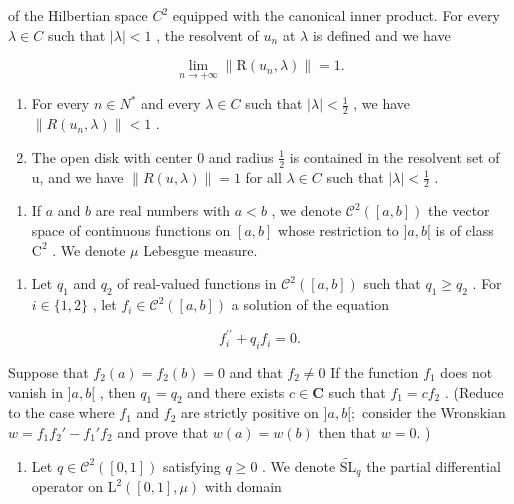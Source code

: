 of the Hilbertian space \(C^{2}\) equipped with the canonical inner product. For every \(\lambda \in C\) such that \(|\lambda| < 1\) , the resolvent of \(u_{n}\) at \(\lambda\) is defined and we have

\[
\lim _ {n \to + \infty} \| \mathrm{R} (u _ {n}, \lambda) \| = 1.
\]

\begin{enumerate}
\def\labelenumi{\alph{enumi})}
\setcounter{enumi}{3}
\tightlist
\item
  For every \(n \in N^{*}\) and every \(\lambda \in C\) such that \(|\lambda| < \frac{1}{2}\) , we have \(\|R(u_{n}, \lambda)\| < 1\) .
\item
  The open disk with center 0 and radius \(\frac{1}{2}\) is contained in the resolvent set of u, and we have \(\|R(u,\lambda)\|=1\) for all \(\lambda\in C\) such that \(|\lambda|<\frac{1}{2}\) .
\end{enumerate}

\begin{enumerate}
\def\labelenumi{\arabic{enumi})}
\setcounter{enumi}{19}
\tightlist
\item
  If \(a\) and \(b\) are real numbers with \(a < b\) , we denote \(\mathcal{C}^2([a,b])\) the vector space of continuous functions on \([a,b]\) whose restriction to \(]a,b[\) is of class \(\mathrm{C}^2\) . We denote \(\mu\) Lebesgue measure.
\end{enumerate}

\begin{enumerate}
\def\labelenumi{\alph{enumi})}
\tightlist
\item
  Let \(q_{1}\) and \(q_{2}\) of real-valued functions in \(\mathcal{C}^{2}([a,b])\) such that \(q_{1} \geqslant q_{2}\) . For \(i \in \{1,2\}\) , let \(f_{i} \in \mathcal{C}^{2}([a,b])\) a solution of the equation
\end{enumerate}

\[
f _ {i} ^ {\prime \prime} + q _ {i} f _ {i} = 0.
\]

Suppose that \(f_{2}(a) = f_{2}(b) = 0\) and that \(f_{2} \neq 0\) If the function \(f_{1}\) does not vanish in \(]a, b[\) , then \(q_{1} = q_{2}\) and there exists \(c \in \mathbf{C}\) such that \(f_{1} = cf_{2}\) . (Reduce to the case where \(f_1\) and \(f_2\) are strictly positive on \(]a, b[;\) consider the Wronskian \(w = f_1f_2' - f_1'f_2\) and prove that \(w(a) = w(b)\) then that \(w = 0.\) )

\begin{enumerate}
\def\labelenumi{\alph{enumi})}
\setcounter{enumi}{1}
\tightlist
\item
  Let \(q \in \mathcal{C}^2([0,1])\) satisfying \(q \geqslant 0\) . We denote \(\widetilde{\mathrm{SL}}_q\) the partial differential operator on \(\mathrm{L}^2([0,1],\mu)\) with domain
\end{enumerate}

